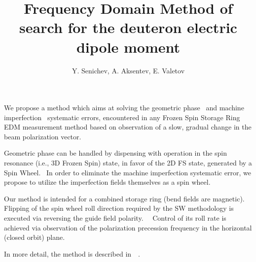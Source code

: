 \documentclass{article}
\begin{document}
\title{Frequency Domain Method of search for the deuteron electric dipole moment}
\author{Y. Senichev, A. Aksentev, E. Valetov}
\date{\nodate}
\maketitle


We propose a method which aims at solving the geometric phase~\cite[p.~6]{BNL:Proton} and
machine imperfection~\cite[pp.~10,~11]{BNL:Deuteron2008} systematic errors,
encountered in any Frozen Spin Storage Ring EDM measurement method based on observation of a slow, gradual
change in the beam polarization vector.

Geometric phase can be handled by dispensing with operation in the spin resonance (i.e., 3D Frozen Spin) state,
in favor of the 2D FS state, generated by a Spin Wheel.~\cite[p.~1963]{Koop:SW}
In order to eliminate the machine imperfection systematic error,
we propose to utilize the imperfection fields themselves as a spin wheel.

Our method is intended for a combined storage ring (bend fields are magnetic).
Flipping of the spin wheel roll direction required by the SW methodology
is executed via reversing the guide field polarity.~\cite{Aksentev:IPAC19:GFF}~\cite{Aksentev:IPAC19:Decoh}
Control of its roll rate is achieved via observation of the polarization
precession frequency in the horizontal (closed orbit) plane.~\cite{Aksentev:IPAC19:GFF}

In more detail, the method is described in~\cite{Senichev:FDM}~\cite{Aksentev:FDM}.
\end{document}
